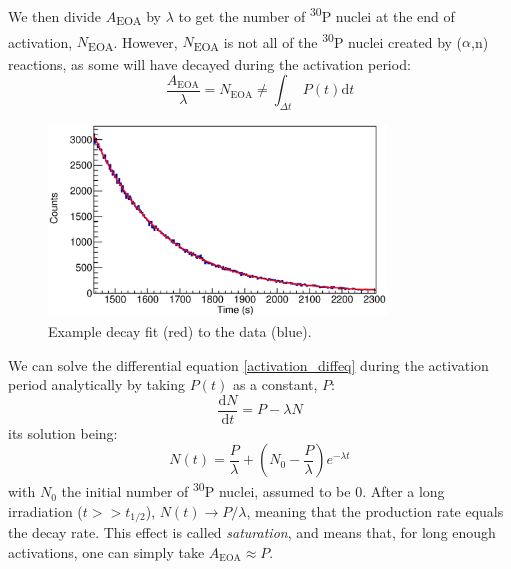 \documentclass[a4paper,12pt]{report}
\newcommand{\dif}{\text{d}}
\newcommand{\ddt}[1]{\frac{\dif #1}{\dif t}}
\newcommand{\an}{($\alpha$,n) }
\newcommand{\Piso}{\textsuperscript{30}P }
\begin{document}
We then divide $A$\textsubscript{EOA} by $\lambda$ to get the number of \Piso nuclei at the end of activation, $N$\textsubscript{EOA}.
However, $N$\textsubscript{EOA} is not all of the \Piso nuclei created by \an reactions, as some will have decayed during the activation period:
\[ \frac{A_\text{EOA}}{\lambda} = N_\text{EOA} \neq \int_{\Delta t}P(t) \dif t \]

\begin{figure}[H]
	\centering
	\includegraphics[width=0.80\textwidth]{example_decay_fit.eps}
	\caption{Example decay fit (red) to the data (blue).}
	\label{example_decay_fit}
\end{figure}

We can solve the differential equation \ref{activation_diffeq} during the activation period analytically by taking $P(t)$ as a constant, $P$:
\begin{equation}
	\ddt{N} = P -\lambda N
\end{equation}
its solution being:
\begin{equation}
	N(t) = \frac{P}{\lambda} + \left(  N_0 - \frac{P}{\lambda}  \right) e^{-\lambda t}
	\label{activation_constantP_solution}
\end{equation}
with $N_0$ the initial number of \Piso nuclei, assumed to be \num{0}.
After a long irradiation ($t>>t_{1/2}$), $N(t)\longrightarrow P/\lambda$, meaning that the production rate equals the decay rate.
This effect is called \textit{saturation}, and means that, for long enough activations, one can simply take $A_\text{EOA}\approx P$.
\end{document}
